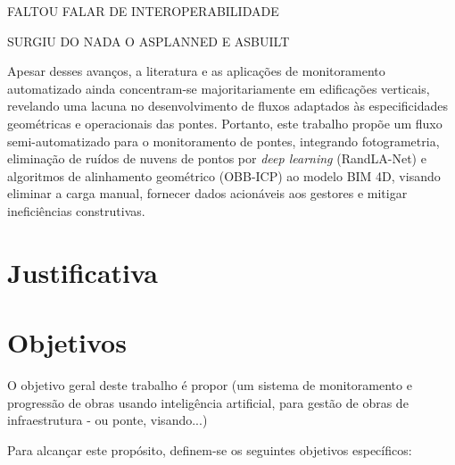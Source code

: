 FALTOU FALAR DE INTEROPERABILIDADE 
 
 
SURGIU DO NADA O ASPLANNED E ASBUILT
 
 Apesar desses avanços, a literatura e as aplicações de monitoramento automatizado ainda concentram-se majoritariamente em edificações verticais, revelando uma lacuna no desenvolvimento de fluxos adaptados às especificidades geométricas e operacionais das pontes. Portanto, este trabalho propõe um fluxo semi-automatizado para o monitoramento de pontes, integrando fotogrametria, eliminação de ruídos de nuvens de pontos por \textit{deep learning} (RandLA-Net) e algoritmos de alinhamento geométrico (OBB-ICP) ao modelo BIM 4D, visando eliminar a carga manual, fornecer dados acionáveis aos gestores e mitigar ineficiências construtivas.
\section{Justificativa}


\section{Objetivos}
\label{sec:objetivos}
O objetivo geral deste trabalho é propor (um sistema de monitoramento e progressão de obras usando inteligência artificial, para gestão de obras de infraestrutura - ou ponte, visando...)  

Para alcançar este propósito, definem-se os seguintes objetivos específicos:

